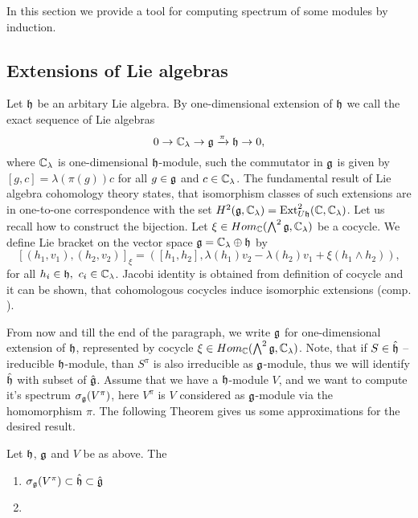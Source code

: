 In this section we provide a tool for computing spectrum of some modules by induction.

\subsection{Extensions of Lie algebras}
Let $\mathfrak{h}$ be an arbitary Lie algebra. By one-dimensional extension of $\mathfrak{h}$ we call the exact
sequence of Lie algebras
\[
    0 \to \mathbb{C}_\lambda\rightarrow \mathfrak{g} \xrightarrow\pi \mathfrak{h} \to 0,
\]
where $\mathbb{C}_\lambda$ is one-dimensional $\mathfrak{h}$-module, such the commutator in $\mathfrak{g}$ is given by
$[g,c] = \lambda(\pi(g))c$ for all $g \in \mathfrak{g}$ and $c \in \mathbb{C}_\lambda$.  The fundamental result of
Lie algebra cohomology theory states, that isomorphism classes of such extensions are in one-to-one
correspondence with the set $H^2(\mathfrak{g},\mathbb{C}_\lambda) = \operatorname{Ext}^2_{U\mathfrak{h}}(\mathbb{C}, \mathbb{C}_\lambda)$. Let
us recall how to construct the bijection. Let $\xi \in Hom_{\mathbb{C}}(\bigwedge^2\mathfrak{g}, \mathbb{C}_\lambda)$ be a
cocycle. We define Lie bracket on the vector space $\mathfrak{g} = \mathbb{C}_\lambda \oplus \mathfrak{h}$ by 
\[
    [(h_1, v_1), (h_2, v_2)]_\xi= ([h_1, h_2], \lambda(h_1) v_2 - \lambda(h_2) v_1 +
    \xi(h_1\wedge h_2)), 
\]
for all $h_i \in \mathfrak{h},~c_i\in \mathbb{C}_\lambda$. Jacobi identity is obtained from definition of cocycle
and it can be shown, that cohomologous cocycles induce isomorphic extensions (comp. ).

From now and till the end of the paragraph, we write $\mathfrak{g}$ for one-dimensional extension of
$\mathfrak{h}$, represented by cocycle $\xi \in Hom_{\mathbb{C}}(\bigwedge^2\mathfrak{g}, \mathbb{C}_\lambda)$. Note, that if $S \in
\hat{\mathfrak{h}}$ -- ireducible $\mathfrak{h}$-module, than $S^\pi$ is also irreducible as $\mathfrak{g}$-module, thus
we will identify $\hat{\mathfrak{h}}$ with subset of $\hat{\mathfrak{g}}$. Assume that we
have a $\mathfrak{h}$-module $V$, and we want to compute it's spectrum $\sigma_{\mathfrak{g}} (V^\pi)$, here
$V^\pi$ is $V$ considered as $\mathfrak{g}$-module via the homomorphism $\pi$. The following Theorem gives
us some approximations for the desired result.
\begin{theorem}
    Let $\mathfrak{h}$, $\mathfrak{g}$ and $V$ be as above. The
    \begin{enumerate}
        \item $\sigma_{\mathfrak{g}}(V^\pi) \subset \hat{\mathfrak{h}} \subset \hat{\mathfrak{g}}$

        \item {}
    \end{enumerate}
\end{theorem}
